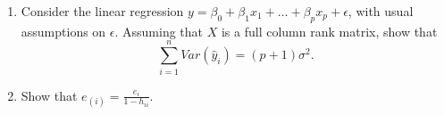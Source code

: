 \documentclass[12pt]{article}%
\begin{document}
\begin{enumerate}[leftmargin=*]
   \item Consider the linear regression $y=\beta_0+\beta_1x_1+\ldots+\beta_px_p+\epsilon$,
      with usual assumptions on $\epsilon$. Assuming that $X$ is a full column rank
      matrix, show that $$\sum_{i=1}^nVar(\widehat y_i)=(p+1)\sigma^2.$$


   \item Show that $e_{(i)} = \frac{e_i}{1-h_{ii}}$.



\end{enumerate}
\end{document}
